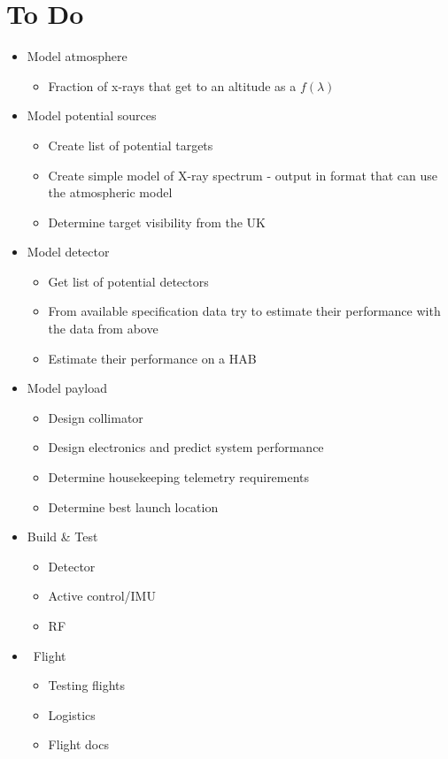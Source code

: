 \documentclass[10pt,a4paper]{article}
\begin{document}
\section*{To Do}

\begin{itemize}

\item Model atmosphere
\begin{itemize}
\item Fraction of x-rays that get to an altitude as a $f\left( \lambda \right)$
\end{itemize}

\item Model potential sources
\begin{itemize}
\item Create list of potential targets
\item Create simple model of X-ray spectrum - output in format that can use the atmospheric model
\item Determine target visibility from the UK
\end{itemize}

\item Model detector
\begin{itemize}
\item Get list of potential detectors
\item From available specification data try to estimate their performance with the data from above
\item Estimate their performance on a HAB
\end{itemize}

\item Model payload
\begin{itemize}
\item Design collimator
\item Design electronics and predict system performance 
\item Determine housekeeping telemetry requirements
\item Determine best launch location
\end{itemize}

\item Build \& Test
\begin{itemize}
\item Detector
\item Active control/IMU
\item RF
\end{itemize}


\item \textbullet \ Flight
\begin{itemize}
\item Testing flights
\item Logistics
\item Flight docs
\end{itemize}
\end{itemize}
\end{document}
